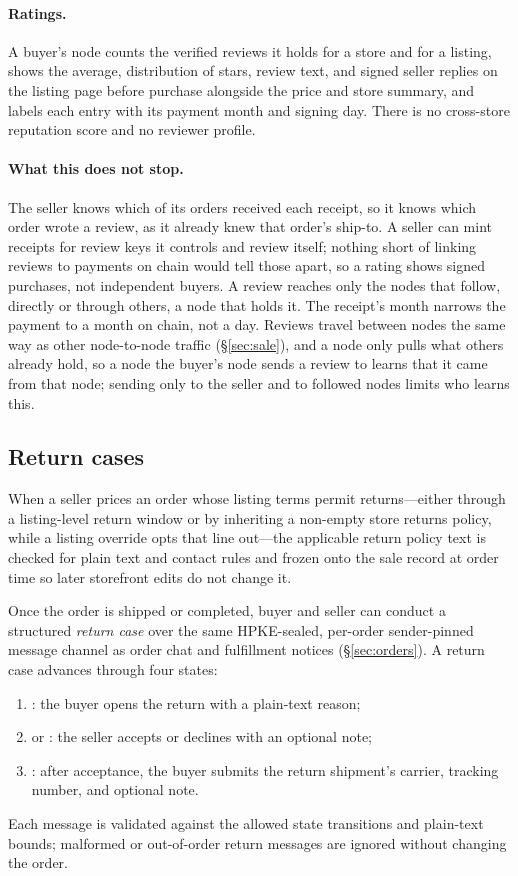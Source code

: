 \paragraph{Ratings.} A buyer's node counts the verified reviews it holds for a store and for a listing, shows the average, distribution of stars, review text, and signed seller replies on the listing page before purchase alongside the price and store summary, and labels each entry with its payment month and signing day. There is no cross-store reputation score and no reviewer profile.

\paragraph{What this does not stop.} The seller knows which of its orders received each receipt, so it knows which order wrote a review, as it already knew that order's ship-to. A seller can mint receipts for review keys it controls and review itself; nothing short of linking reviews to payments on chain would tell those apart, so a rating shows signed purchases, not independent buyers. A review reaches only the nodes that follow, directly or through others, a node that holds it. The receipt's month narrows the payment to a month on chain, not a day. Reviews travel between nodes the same way as other node-to-node traffic (\S\ref{sec:sale}), and a node only pulls what others already hold, so a node the buyer's node sends a review to learns that it came from that node; sending only to the seller and to followed nodes limits who learns this.

\subsection{Return cases}
\label{sec:returns}

When a seller prices an order whose listing terms permit returns---either through a listing-level return window or by inheriting a non-empty store returns policy, while a  listing override opts that line out---the applicable return policy text is checked for plain text and contact rules and frozen onto the sale record at order time so later storefront edits do not change it.

Once the order is shipped or completed, buyer and seller can conduct a structured \emph{return case} over the same HPKE-sealed, per-order sender-pinned message channel as order chat and fulfillment notices (\S\ref{sec:orders}). A return case advances through four states:
\begin{enumerate}
  \item {}: the buyer opens the return with a plain-text reason;
  \item {} or : the seller accepts or declines with an optional note;
  \item {}: after acceptance, the buyer submits the return shipment's carrier, tracking number, and optional note.
\end{enumerate}
Each message is validated against the allowed state transitions and plain-text bounds; malformed or out-of-order return messages are ignored without changing the order.

